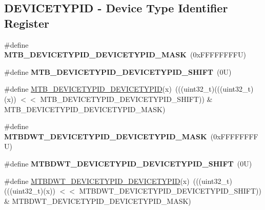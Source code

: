 \subsection*{D\+E\+V\+I\+C\+E\+T\+Y\+P\+ID -\/ Device Type Identifier Register}
\begin{DoxyCompactItemize}
\item 
\mbox{\label{group___m_t_b___register___masks_ga67e83a0bbb46ccb3456f83b4f1b39a86}} 
\#define {\bfseries M\+T\+B\+\_\+\+D\+E\+V\+I\+C\+E\+T\+Y\+P\+I\+D\+\_\+\+D\+E\+V\+I\+C\+E\+T\+Y\+P\+I\+D\+\_\+\+M\+A\+SK}~(0x\+F\+F\+F\+F\+F\+F\+F\+F\+U)
\item 
\mbox{\label{group___m_t_b___register___masks_ga233d82a0813df4ea2de5bdaf77f49b27}} 
\#define {\bfseries M\+T\+B\+\_\+\+D\+E\+V\+I\+C\+E\+T\+Y\+P\+I\+D\+\_\+\+D\+E\+V\+I\+C\+E\+T\+Y\+P\+I\+D\+\_\+\+S\+H\+I\+FT}~(0\+U)
\item 
\#define \mbox{\hyperlink{group___m_t_b___register___masks_gaf291bcc52e0eb418b9f7ccefe6c47df2}{M\+T\+B\+\_\+\+D\+E\+V\+I\+C\+E\+T\+Y\+P\+I\+D\+\_\+\+D\+E\+V\+I\+C\+E\+T\+Y\+P\+ID}}(x)~(((uint32\+\_\+t)(((uint32\+\_\+t)(x)) $<$$<$ M\+T\+B\+\_\+\+D\+E\+V\+I\+C\+E\+T\+Y\+P\+I\+D\+\_\+\+D\+E\+V\+I\+C\+E\+T\+Y\+P\+I\+D\+\_\+\+S\+H\+I\+FT)) \& M\+T\+B\+\_\+\+D\+E\+V\+I\+C\+E\+T\+Y\+P\+I\+D\+\_\+\+D\+E\+V\+I\+C\+E\+T\+Y\+P\+I\+D\+\_\+\+M\+A\+SK)
\item 
\mbox{\label{group___m_t_b___register___masks_ga6986bcf237d6ff96e25d6458355ef4b8}} 
\#define {\bfseries M\+T\+B\+D\+W\+T\+\_\+\+D\+E\+V\+I\+C\+E\+T\+Y\+P\+I\+D\+\_\+\+D\+E\+V\+I\+C\+E\+T\+Y\+P\+I\+D\+\_\+\+M\+A\+SK}~(0x\+F\+F\+F\+F\+F\+F\+F\+F\+U)
\item 
\mbox{\label{group___m_t_b___register___masks_ga8caaff8277e4bdaee5735e22d6eb6e7c}} 
\#define {\bfseries M\+T\+B\+D\+W\+T\+\_\+\+D\+E\+V\+I\+C\+E\+T\+Y\+P\+I\+D\+\_\+\+D\+E\+V\+I\+C\+E\+T\+Y\+P\+I\+D\+\_\+\+S\+H\+I\+FT}~(0\+U)
\item 
\#define \mbox{\hyperlink{group___m_t_b___register___masks_gaeb9942e9e9c4c3c52ef545b4d49e113d}{M\+T\+B\+D\+W\+T\+\_\+\+D\+E\+V\+I\+C\+E\+T\+Y\+P\+I\+D\+\_\+\+D\+E\+V\+I\+C\+E\+T\+Y\+P\+ID}}(x)~(((uint32\+\_\+t)(((uint32\+\_\+t)(x)) $<$$<$ M\+T\+B\+D\+W\+T\+\_\+\+D\+E\+V\+I\+C\+E\+T\+Y\+P\+I\+D\+\_\+\+D\+E\+V\+I\+C\+E\+T\+Y\+P\+I\+D\+\_\+\+S\+H\+I\+FT)) \& M\+T\+B\+D\+W\+T\+\_\+\+D\+E\+V\+I\+C\+E\+T\+Y\+P\+I\+D\+\_\+\+D\+E\+V\+I\+C\+E\+T\+Y\+P\+I\+D\+\_\+\+M\+A\+SK)
\end{DoxyCompactItemize}
